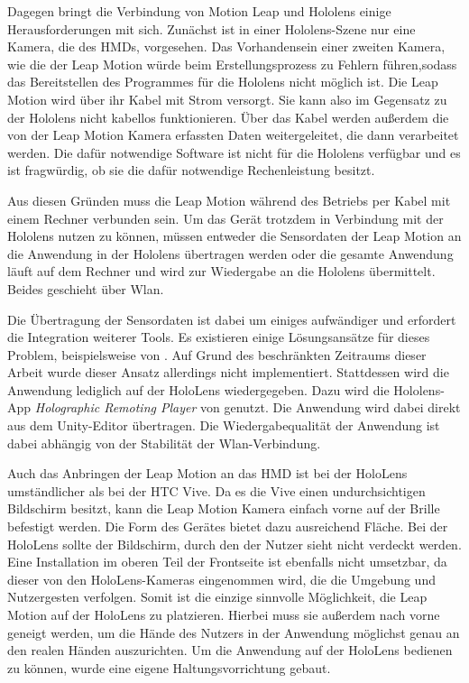 Dagegen bringt die Verbindung von Motion Leap und Hololens einige Herausforderungen mit sich. Zunächst ist in einer Hololens-Szene nur eine Kamera, die des HMDs, vorgesehen. Das Vorhandensein einer zweiten Kamera, wie die der Leap Motion würde beim Erstellungsprozess zu Fehlern führen,sodass das Bereitstellen des Programmes für die Hololens nicht möglich ist.
Die Leap Motion wird über ihr Kabel mit Strom versorgt. Sie kann also im Gegensatz zu der Hololens nicht kabellos funktionieren. 
Über das Kabel werden außerdem die von der Leap Motion Kamera erfassten Daten weitergeleitet, die dann verarbeitet werden. Die dafür notwendige Software ist nicht für die Hololens verfügbar und es ist fragwürdig, ob sie die dafür notwendige Rechenleistung besitzt. 

Aus diesen Gründen muss die Leap Motion während des Betriebs per Kabel mit einem Rechner verbunden sein. Um das Gerät trotzdem in Verbindung mit der Hololens nutzen zu können, müssen entweder die Sensordaten der Leap Motion an die Anwendung in der Hololens übertragen werden oder die gesamte Anwendung läuft auf dem Rechner und wird zur Wiedergabe an die Hololens übermittelt. Beides geschieht über Wlan.

Die Übertragung der Sensordaten ist dabei um einiges aufwändiger und erfordert die Integration weiterer Tools. Es existieren einige Lösungsansätze für dieses Problem, beispielsweise von \cite{hololensGithub}. Auf Grund des beschränkten Zeitraums dieser Arbeit wurde dieser Ansatz allerdings nicht implementiert.
Stattdessen wird die Anwendung lediglich auf der HoloLens wiedergegeben. Dazu wird die Hololens-App \textit{Holographic Remoting Player} von \cite{remoteApp} genutzt. Die Anwendung wird dabei direkt aus dem Unity-Editor übertragen.
Die Wiedergabequalität der Anwendung ist dabei abhängig von der Stabilität der Wlan-Verbindung.

Auch das Anbringen der Leap Motion an das HMD ist bei der HoloLens umständlicher als bei der HTC Vive. 
Da es die Vive einen undurchsichtigen Bildschirm besitzt, kann die Leap Motion Kamera einfach vorne auf der Brille befestigt werden. Die Form des Gerätes bietet dazu ausreichend Fläche.
Bei der HoloLens sollte der Bildschirm, durch den der Nutzer sieht nicht verdeckt werden. Eine Installation  im oberen Teil der Frontseite ist ebenfalls nicht umsetzbar, da dieser von den HoloLens-Kameras eingenommen wird, die die Umgebung und Nutzergesten verfolgen.
Somit ist die einzige sinnvolle Möglichkeit, die Leap Motion auf der HoloLens zu platzieren. Hierbei muss sie außerdem nach vorne geneigt werden, um die Hände des Nutzers in der Anwendung möglichst genau an den realen Händen auszurichten. 
Um die Anwendung auf der HoloLens bedienen zu können, wurde eine eigene Haltungsvorrichtung gebaut.

